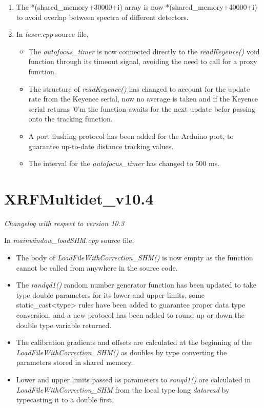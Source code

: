 \documentclass[a4paper,12pt]{article}
\begin{document}
\begin{enumerate}
	\item The *(shared\_memory+30000+i) array is now *(shared\_memory+40000+i) to avoid overlap between spectra of different detectors.
	\item In \textit{laser.cpp} source file,
	\begin{itemize}
		\item The \textit{autofocus\_timer} is now connected directly to the \textit{readKeyence()} void function through its timeout signal, avoiding the need to call for a proxy function.
		\item The structure of \textit{readKeyence()} has changed to account for the update rate from the Keyence serial, now no average is taken and if the Keyence serial returns '0'm the function awaits for the next update befor passing onto the tracking function.
		\item A port flushing protocol has been added for the Arduino port, to guarantee up-to-date distance tracking values.
		\item The interval for the \textit{autofocus\_timer} has changed to 500 ms.
	\end{itemize}
\end{enumerate}


\section{XRFMultidet\_v10.4}
\textit{Changelog with respect to version 10.3}

In \textit{mainwindow\_loadSHM.cpp} source file, 
\begin{itemize}
	\item{The body of \textit{LoadFileWithCorrection\_SHM()} is now empty as the function cannot be called from anywhere in the source code.}
	\item{The \textit{randqd1()} random number generator function has been updated to take type double parameters for its lower and upper limits, some static\_cast<type> rules have been added to guarantee proper data type conversion, and a new protocol has been added to round up or down the double type variable returned.}
	\item{The calibration gradients and offsets are calculated at the beginning of the \textit{LoadFileWithCorrection\_SHM()} as doubles by type converting the parameters stored in shared memory.} 
	\item{Lower and upper limits passed as parameters to \textit{ranqd1()} are calculated in \textit{LoadFileWithCorrection\_SHM} from the local type long \textit{dataread} by typecasting it to a double first.}
\end{itemize}
\end{document}
